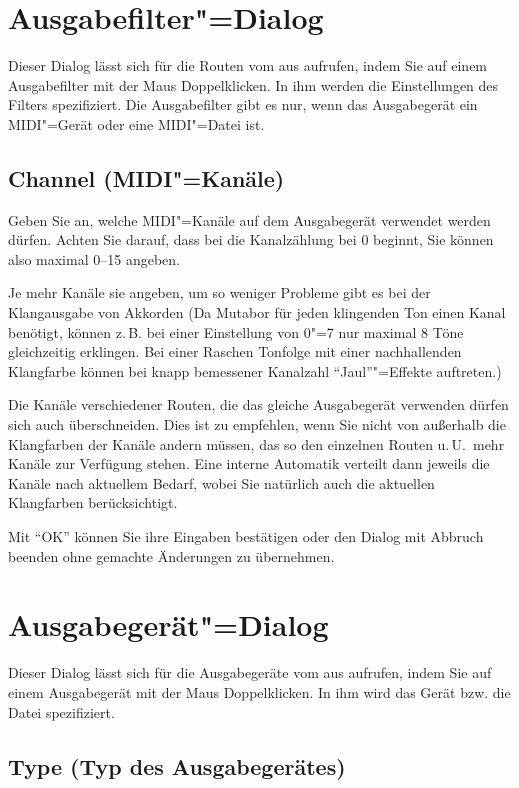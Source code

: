 \section{Ausgabefilter"=Dialog}\label{sec:DE_R3}
Dieser Dialog lässt sich für die Routen vom  
aus aufrufen, indem Sie auf einem Ausgabefilter mit der Maus 
Doppelklicken. In ihm werden die Einstellungen des Filters spezifiziert. 
Die Ausgabefilter gibt es nur, wenn das Ausgabegerät ein MIDI"=Gerät 
oder eine MIDI"=Datei ist.

\subsection{Channel (MIDI"=Kanäle)}
Geben Sie an, welche MIDI"=Kanäle auf dem Ausgabegerät verwendet 
werden dürfen. Achten Sie darauf, dass bei \mutabor{} die 
Kanalzählung bei 0 beginnt, Sie können also maximal 0--15 
angeben.

Je mehr Kanäle sie angeben, um so weniger Probleme gibt es bei der
Klangausgabe von Akkorden (Da Mutabor für jeden klingenden Ton einen
Kanal benötigt, können z.\,B. bei einer Einstellung von 0"=7 nur maximal
8 Töne gleichzeitig erklingen. Bei einer Raschen Tonfolge mit einer
nachhallenden Klangfarbe können bei knapp bemessener Kanalzahl
"`Jaul"'"=Effekte auftreten.)

Die Kanäle verschiedener Routen, die das gleiche Ausgabegerät 
verwenden dürfen sich auch überschneiden. Dies ist zu empfehlen, 
wenn Sie nicht von außerhalb die Klangfarben der Kanäle andern 
müssen, das so den einzelnen Routen u.\,U.\ mehr Kanäle zur 
Verfügung stehen. Eine interne Automatik verteilt dann jeweils 
die Kanäle nach aktuellem Bedarf, wobei Sie natürlich auch 
die aktuellen Klangfarben berücksichtigt.

Mit "`OK"' können Sie ihre Eingaben bestätigen oder den Dialog 
mit Abbruch beenden ohne gemachte Änderungen zu übernehmen.


\section{Ausgabegerät"=Dialog}
\label{sec:DE_R4}

Dieser Dialog lässt sich für die Ausgabegeräte vom  
aus aufrufen, indem Sie auf einem Ausgabegerät mit der Maus 
Doppelklicken. In ihm wird das Gerät bzw. die Datei spezifiziert.

\subsection{Type (Typ des Ausgabegerätes)}

